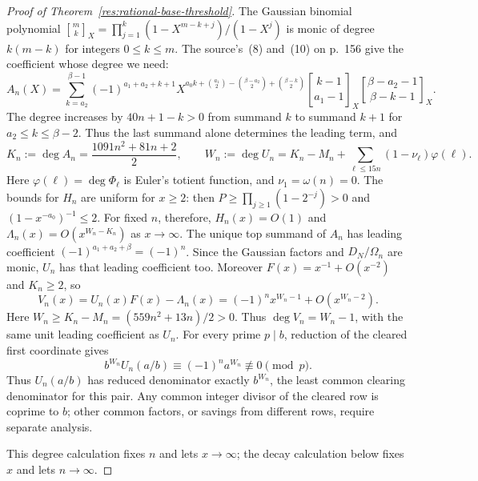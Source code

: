 \documentclass[11pt]{article}
\begin{document}
\begin{proof}[Proof of Theorem~\ref{res:rational-base-threshold}]
The Gaussian binomial polynomial
$\genfrac{[}{]}{0pt}{}{m}{k}_X=\prod_{j=1}^k(1-X^{m-k+j})/(1-X^j)$
is monic of degree $k(m-k)$ for integers $0\le k\le m$. The source's~(8) and~(10)
on p.~156 give the coefficient whose degree we need:
\[
 A_n(X)=\sum_{k=a_2}^{\beta-1}(-1)^{a_1+a_2+k+1}
 X^{a_0k+\binom{a_1}{2}-\binom{\beta-a_2}{2}+\binom{\beta-k}{2}}
 \genfrac{[}{]}{0pt}{}{k-1}{a_1-1}_X
 \genfrac{[}{]}{0pt}{}{\beta-a_2-1}{\beta-k-1}_X.
\]
The degree increases by $40n+1-k>0$ from summand $k$ to summand $k+1$
for $a_2\le k\le\beta-2$. Thus the last summand alone determines the
leading term, and
\[
 K_n:=\deg A_n=\frac{1091n^2+81n+2}{2},\qquad
 W_n:=\deg U_n=K_n-M_n+\sum_{\ell\le15n}(1-\nu_\ell)\varphi(\ell).
\]
Here $\varphi(\ell)=\deg\Phi_\ell$ is Euler's totient function, and
$\nu_1=\omega(n)=0$. The bounds for $H_n$ are uniform for $x\ge2$:
then $P\ge\prod_{j\ge1}(1-2^{-j})>0$ and
$(1-x^{-a_0})^{-1}\le2$. For fixed $n$, therefore,
$H_n(x)=O(1)$ and $\Lambda_n(x)=O(x^{W_n-K_n})$ as $x\to\infty$.
The unique top summand of $A_n$ has leading coefficient
$(-1)^{a_1+a_2+\beta}=(-1)^n$. Since the Gaussian factors and
$D_N/\Omega_n$ are monic, $U_n$ has that leading coefficient too.
Moreover $F(x)=x^{-1}+O(x^{-2})$ and $K_n\ge2$, so
\[
 V_n(x)=U_n(x)F(x)-\Lambda_n(x)
       =(-1)^n x^{W_n-1}+O(x^{W_n-2}).
\]
Here $W_n\ge K_n-M_n=(559n^2+13n)/2>0$. Thus
$\deg V_n=W_n-1$, with the same unit leading coefficient as $U_n$.
For every prime $p\mid b$, reduction of the cleared first coordinate gives
\[
 b^{W_n}U_n(a/b)\equiv(-1)^n a^{W_n}\not\equiv0\pmod p.
\]
Thus $U_n(a/b)$ has reduced denominator exactly $b^{W_n}$,
the least common clearing denominator for this pair. Any common integer divisor
of the cleared row is coprime to $b$; other common factors, or savings
from different rows, require separate analysis.

This degree calculation fixes $n$ and lets $x\to\infty$; the decay
calculation below fixes $x$ and lets $n\to\infty$.



\end{proof}
\end{document}
